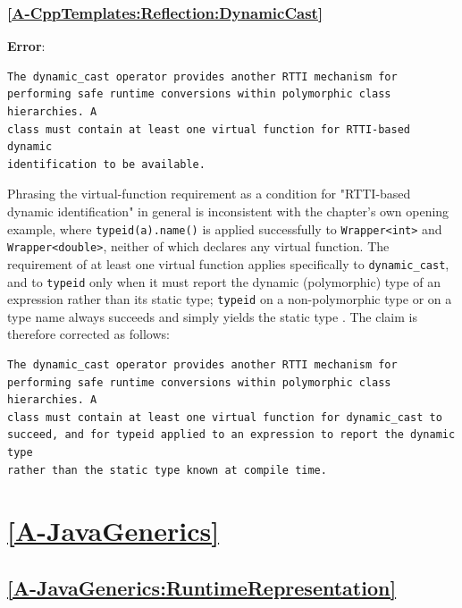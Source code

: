 \documentclass[11pt]{report}
\begin{document}
\subsubsection*{\hyperref[A-CppTemplates:Reflection:DynamicCast]{\ref*{A-CppTemplates:Reflection:DynamicCast} }}
\noindent\textbf{Error}:
\begin{Verbatim}[breaklines=true]
The dynamic_cast operator provides another RTTI mechanism for
performing safe runtime conversions within polymorphic class hierarchies. A
class must contain at least one virtual function for RTTI-based dynamic
identification to be available.
\end{Verbatim}
Phrasing the virtual-function requirement as a condition for "RTTI-based
dynamic identification" in general is inconsistent with the chapter's own
opening example, where \newline \texttt{typeid(a).name()} is applied successfully to
\texttt{Wrapper<int>} and \texttt{Wrapper<double>}, neither of which declares
any virtual function. The requirement of at least one virtual function
applies specifically to \texttt{dynamic\_cast}, and to \texttt{typeid} only
when it must report the dynamic (polymorphic) type of an expression rather
than its static type; \texttt{typeid} on a non-polymorphic type or on a type
name always succeeds and simply yields the static type \cite{cppreference}.
The claim is therefore corrected as follows:
\begin{Verbatim}[breaklines=true]
The dynamic_cast operator provides another RTTI mechanism for
performing safe runtime conversions within polymorphic class hierarchies. A
class must contain at least one virtual function for dynamic_cast to
succeed, and for typeid applied to an expression to report the dynamic type
rather than the static type known at compile time.
\end{Verbatim}

\section*{\hyperref[A-JavaGenerics]{\ref*{A-JavaGenerics} }}

\subsection*{\hyperref[A-JavaGenerics:RuntimeRepresentation]{\ref*{A-JavaGenerics:RuntimeRepresentation} }}
\end{document}
